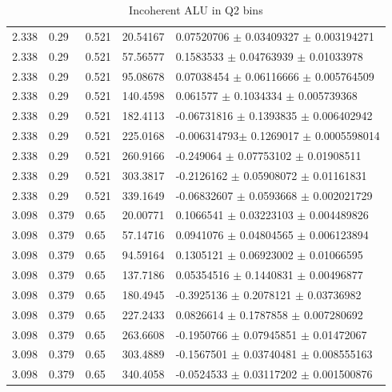 \begin{table}[!h]
\begin{center}
\begin{tabular}{||l|l|l|l|l||}
   
         \hline
  2.338 & 0.29 & 0.521  & 20.54167 & 0.07520706  $\pm$   0.03409327  $\pm$ 
0.003194271   \\
  2.338 & 0.29 & 0.521  & 57.56577 & 0.1583533   $\pm$   0.04763939  $\pm$ 0.01033978    \\
  2.338 & 0.29 & 0.521  & 95.08678 & 0.07038454  $\pm$   0.06116666  $\pm$ 0.005764509   \\
  2.338 & 0.29 & 0.521  & 140.4598 & 0.061577    $\pm$   0.1034334   $\pm$ 0.005739368   \\
  2.338 & 0.29 & 0.521  & 182.4113 & -0.06731816 $\pm$   0.1393835   $\pm$ 0.006402942   \\
  2.338 & 0.29 & 0.521  & 225.0168 & -0.006314793$\pm$   0.1269017   $\pm$ 0.0005598014  \\
  2.338 & 0.29 & 0.521  & 260.9166 & -0.249064   $\pm$   0.07753102  $\pm$ 0.01908511    \\
  2.338 & 0.29 & 0.521  & 303.3817 & -0.2126162  $\pm$   0.05908072  $\pm$ 0.01161831    \\
  2.338 & 0.29 & 0.521  & 339.1649 & -0.06832607 $\pm$   0.0593668   $\pm$ 0.002021729   \\
   
     
         \hline
  3.098 &0.379 & 0.65  & 20.00771 & 0.1066541  $\pm$   0.03223103  $\pm$   
0.004489826   \\
  3.098 &0.379 & 0.65  & 57.14716 & 0.0941076  $\pm$   0.04804565  $\pm$   0.006123894   \\
  3.098 &0.379 & 0.65  & 94.59164 & 0.1305121  $\pm$   0.06923002  $\pm$   0.01066595    \\
  3.098 &0.379 & 0.65  & 137.7186 & 0.05354516 $\pm$   0.1440831   $\pm$   0.00496877    \\
  3.098 &0.379 & 0.65  & 180.4945 & -0.3925136 $\pm$   0.2078121   $\pm$   0.03736982    \\
  3.098 &0.379 & 0.65  & 227.2433 & 0.0826614  $\pm$   0.1787858   $\pm$   0.007280692   \\
  3.098 &0.379 & 0.65  & 263.6608 & -0.1950766 $\pm$   0.07945851  $\pm$   0.01472067    \\
  3.098 &0.379 & 0.65  & 303.4889 & -0.1567501 $\pm$   0.03740481  $\pm$   0.008555163   \\
  3.098 &0.379 & 0.65  & 340.4058 & -0.0524533 $\pm$   0.03117202  $\pm$   0.001500876   \\    

         \hline
         \hline
      \end{tabular}
      \caption{Incoherent ALU in Q2 bins}
      \label{table:InCoh_Q2_BSA}
   \end{center}
\end{table}


